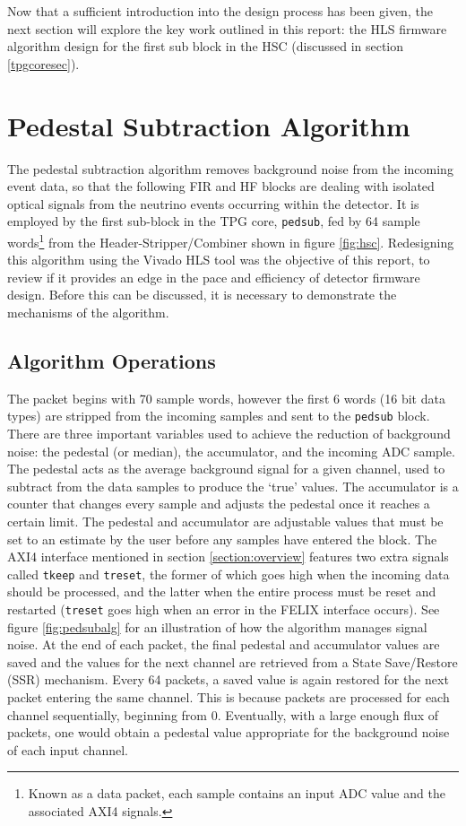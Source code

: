 \documentclass[10pt]{article}
\begin{document}
Now that a sufficient introduction into the design process has been given, the next section will explore the key work outlined in this report: the HLS firmware algorithm design for the first sub block in the HSC (discussed in section \ref{tpgcoresec}).

\section{Pedestal Subtraction Algorithm}\label{pedsubalg}

The pedestal subtraction algorithm removes background noise from the incoming event data, so that the following FIR and HF blocks are dealing with isolated optical signals from the neutrino events occurring within the detector. It is employed by the first sub-block in the TPG core, \texttt{pedsub}, fed by 64 sample words\footnote{Known as a data packet, each sample contains an input ADC value and the associated AXI4 signals.} from the Header-Stripper/Combiner shown in figure \ref{fig:hsc}. Redesigning this algorithm using the Vivado HLS tool was the objective of this report, to review if it provides an edge in the pace and efficiency of detector firmware design. Before this can be discussed, it is necessary to demonstrate the mechanisms of the algorithm.

\subsection{Algorithm Operations}

The packet begins with 70 sample words, however the first 6 words (16 bit data types) are stripped from the incoming samples and sent to the \texttt{pedsub} block. There are three important variables used to achieve the reduction of background noise: the pedestal (or median), the accumulator, and the incoming ADC sample. The pedestal acts as the average background signal for a given channel, used to subtract from the data samples to produce the `true' values. The accumulator is a counter that changes every sample and adjusts the pedestal once it reaches a certain limit. The pedestal and accumulator are adjustable values that must be set to an estimate by the user before any samples have entered the block.  The AXI4 interface mentioned in section \ref{section:overview} features two extra signals called \texttt{tkeep} and \texttt{treset}, the former of which goes high when the incoming data should be processed, and the latter when the entire process must be reset and restarted (\texttt{treset} goes high when an error in the FELIX interface occurs). See figure \ref{fig:pedsubalg} for an illustration of how the algorithm manages signal noise. At the end of each packet, the final pedestal and accumulator values are saved and the values for the next channel are retrieved from a State Save/Restore (SSR) mechanism. Every 64 packets, a saved value is again restored for the next packet entering the same channel. This is because packets are processed for each channel sequentially, beginning from 0. Eventually, with a large enough flux of packets, one would obtain a pedestal value appropriate for the background noise of each input channel.
\end{document}
